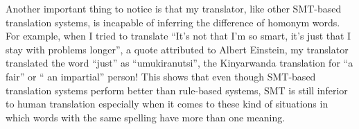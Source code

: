 Another important thing to notice is that my translator, like other SMT-based translation systems, is incapable of inferring the difference of homonym words. For example, when I tried to translate ``It’s not that I’m so smart, it’s just that I stay with problems longer'', a quote attributed to Albert Einstein, my translator translated the word ``just'' as ``umukiranutsi'', the Kinyarwanda translation for ``a fair'' or  `` an impartial'' person! This shows that even though SMT-based translation systems perform better than rule-based systems, SMT is still inferior to human translation especially when it comes to these kind of situations in which words with the same spelling have more than one meaning.
\clearpage
